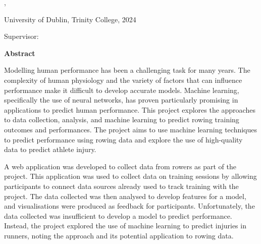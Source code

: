 \begin{center}
  \vspace{3cm}
  \textbf{\Huge\thesistitle}

  \begin{minipage}{12cm}
    \begin{center}
      \thesissubtitle
    \end{center}
  \end{minipage}

  \vspace{1cm}

  \authorname, \degree

  University of Dublin, Trinity College, 2024

  Supervisor: \supervisor

  \vspace{1.5cm}
  \textbf{Abstract}
\end{center}


Modelling human performance has been a challenging task for many years. The complexity of human physiology and the variety of factors that can influence performance make it difficult to develop accurate models. Machine learning, specifically the use of neural networks, has proven particularly promising in applications to predict human performance. This project explores the approaches to data collection, analysis, and machine learning to predict rowing training outcomes and performances. The project aims to use machine learning techniques to predict performance using rowing data and explore the use of high-quality data to predict athlete injury. 

A web application was developed to collect data from rowers as part of the project. This application was used to collect data on training sessions by allowing participants to connect data sources already used to track training with the project. The data collected was then analysed to develop features for a model, and visualisations were produced as feedback for participants. Unfortunately, the data collected was insufficient to develop a model to predict performance. Instead, the project explored the use of machine learning to predict injuries in runners, noting the approach and its potential application to rowing data.

